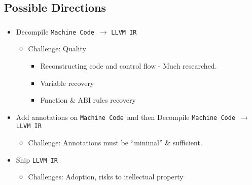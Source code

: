 \documentclass[mathserif,10pt]{beamer}
\newcommand{\cmt}[1]{}
\newcommand{\LIR}{{\tt LLVM IR}}
\newcommand{\MC}{{\tt Machine Code}}
\begin{document}
  \subsection*{Possible Directions}
  \frame
  {
    \frametitle{\subsecname}
    \begin{itemize}
      \item Decompile \MC \ $\rightarrow$ \LIR 
        \begin{itemize}
          \item Challenge: Quality     
            \begin{itemize}
              \item Reconstructing code and control flow - Much researched.
              \item Variable recovery
              \item Function \& ABI rules recovery
            \end{itemize}
        \end{itemize}
      \item Add annotations on \MC \ and then  Decompile \MC \ $\rightarrow$ \LIR 
        \begin{itemize}
          \item Challenge: Annotations must be ``minimal'' \& sufficient.
        \end{itemize}
      \item Ship \LIR
        \begin{itemize}
          \item Challenges: Adoption, risks to itellectual property
        \end{itemize}
    \end{itemize}

    \cmt{
        These methods make various trade-offs between ease of adoption, binary size,
        ease of shipping, and quality of the resulting LLVMIR, which directly
          affects the benefits that allvm provides.

    \begin{itemize}
      \item Reconstructing code and control flow
        \begin{itemize}
          \item Diffrentiate data \& code.
          \item Indirect branch/call.
          \item Variable instruction size
          \item Position independent code (PIC) sequences
          \item Hand crafted assembly code
        \end{itemize}
      \item Variable recovery
      \item Function \& ABI rules recovery 
    \end{itemize}
    }
  }
\end{document}
